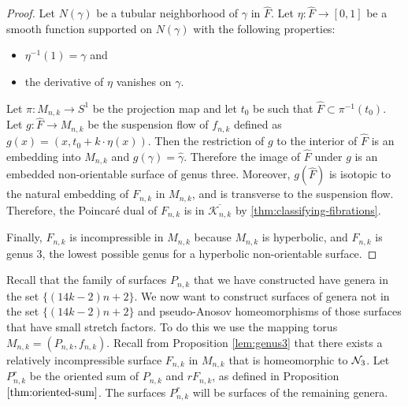 \begin{proof}
  Let $N(\gamma)$ be a tubular neighborhood of $\gamma$ in $\widehat{F}$.  Let $\eta: \widehat{F} \xrightarrow{} [0,1]$ be a smooth function supported on $N(\gamma)$ with the following properties:
  \begin{itemize}
      \item $\eta^{-1}(1) = \gamma$ and
      \item the derivative of $\eta$ vanishes on $\gamma$. 
    \end{itemize}
Let $\pi:M_{n,k}\rightarrow S^1$ be the projection map and let $t_0$ be such that $\widehat{F}\subset\pi^{-1}(t_0)$.  Let $g: \widehat{F} \xrightarrow{} M_{n,k}$ be the suspension flow of $f_{n,k}$ defined as $g(x) =(x,t_0+k\cdot\eta(x))$. Then the restriction of $g$ to the interior of $\widehat{F}$ is an embedding into $M_{n,k}$ and $g(\gamma) = \widehat{\gamma}$. Therefore the image of $\widehat{F}$ under $g$ is an embedded non-orientable surface of genus three. Moreover, $g(\widehat{F})$ is isotopic to the natural embedding of $F_{n,k}$ in $M_{n,k}$, and is transverse to the suspension flow.  
  Therefore, the Poincar\'e dual of $F_{n,k}$ is in $\overline{\mathcal{K}_{n,k}}$ by \autoref{thm:classifying-fibrations}.
   
  Finally, $F_{n,k}$ is incompressible in $M_{n,k}$ because $M_{n,k}$ is hyperbolic, and $F_{n,k}$ is genus $3$, the
  lowest possible genus for a hyperbolic non-orientable surface.
\end{proof}



Recall that the family of surfaces $P_{n,k}$ that we have constructed have genera in the set $\{(14k-2)n+2\}$.
We now want to construct surfaces of genera not in the set $\{(14k-2)n+2\}$ and pseudo-Anosov homeomorphisms of those surfaces that have small stretch factors.  To do this we use the mapping torus $M_{n,k}= (P_{n,k},f_{n,k})$. Recall from Proposition \ref{lem:genus3} that there exists a relatively incompressible surface $F_{n,k}$ in $M_{n,k}$ that is homeomorphic to $\mathcal{N}_3$.  Let $P_{n,k}^r$ be the oriented sum of $P_{n,k}$ and
$rF_{n,k}$, as defined in Proposition $\ref{thm:oriented-sum}$.  The surfaces $P_{n,k}^r$ will be surfaces of the remaining genera.

